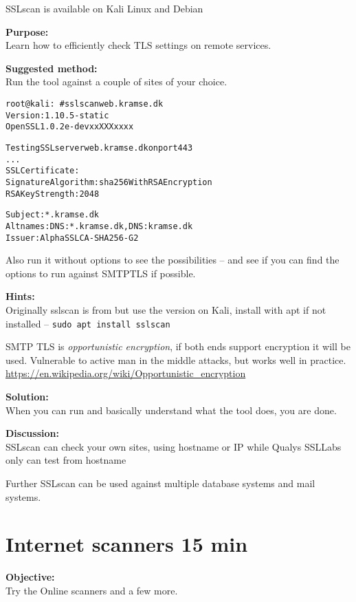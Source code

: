 \documentclass[a4paper,11pt,notitlepage]{report}
\begin{document}
SSLscan is available on Kali Linux and Debian

{\bf Purpose:}\\
Learn how to efficiently check TLS settings on remote services.

{\bf Suggested method:}\\
Run the tool against a couple of sites of your choice.

\begin{alltt}\small
root@kali:~# sslscan web.kramse.dk
Version: 1.10.5-static
OpenSSL 1.0.2e-dev xx XXX xxxx

Testing SSL server web.kramse.dk on port 443
...
  SSL Certificate:
Signature Algorithm: sha256WithRSAEncryption
RSA Key Strength:    2048

Subject:  *.kramse.dk
Altnames: DNS:*.kramse.dk, DNS:kramse.dk
Issuer:   AlphaSSL CA - SHA256 - G2
\end{alltt}

Also run it without options to see the possibilities -- and see if you can find the options to run against SMTPTLS if possible.

{\bf Hints:}\\
Originally sslscan is from  but use the version on Kali, install with apt if not installed -- \verb+sudo apt install sslscan+

SMTP TLS is \emph{opportunistic encryption}, if both ends support encryption it will be used. Vulnerable to active man in the middle attacks, but works well in practice.\\
\url{https://en.wikipedia.org/wiki/Opportunistic_encryption}

{\bf Solution:}\\
When you can run and basically understand what the tool does, you are done.

{\bf Discussion:}\\
SSLscan can check your own sites, using hostname or IP while Qualys SSLLabs only can test from hostname

Further SSLscan can be used against multiple database systems and mail systems.

\chapter{Internet scanners 15 min}
\label{ex:web-site-check}

{\bf Objective:}\\
Try the Online scanners  and a few more.
\end{document}
